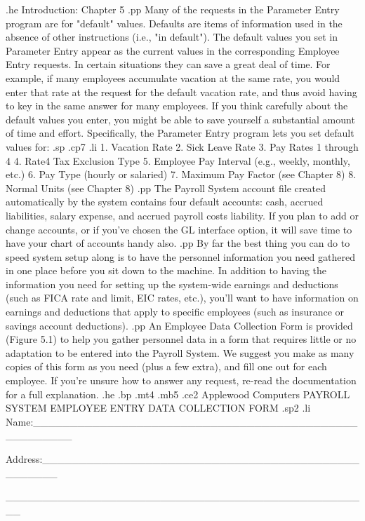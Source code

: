 .he Introduction: Chapter 5
.pp
Many of the requests in the Parameter Entry program are for "default"
values.  Defaults are items of information used in the absence of other
instructions (i.e., "in default").  The default values you set in
Parameter Entry appear as the current values in the corresponding
Employee Entry requests. In certain situations they can save a great
deal of time.  For example, if many employees accumulate vacation at
the same rate, you would enter that rate at the request for the default
vacation rate, and thus avoid having to key in the same answer for
many employees.  If you think carefully about the default values you
enter, you might be able to save yourself a substantial amount
of time and effort.  Specifically,
the Parameter Entry program lets you set default values for:
.sp
.cp7
.li
	1. Vacation Rate
	2. Sick Leave Rate
	3. Pay Rates 1 through 4
	4. Rate4 Tax Exclusion Type
	5. Employee Pay Interval (e.g., weekly, monthly, etc.)
	6. Pay Type (hourly or salaried)
	7. Maximum Pay Factor (see Chapter 8)
	8. Normal Units (see Chapter 8)
.pp
The Payroll System account file created automatically by the system contains
four default accounts: cash, accrued liabilities, salary expense, and accrued
payroll costs liability.  If you plan to add or change accounts, or if you've
chosen the GL interface option, it will save time to have your chart
of accounts handy also.
.pp
By far the best thing you can do to speed system setup along is to have the
personnel information you need gathered in one place before you sit
down to the machine.  In addition to having the information you need for
setting up the system-wide earnings and deductions (such as FICA rate
and limit, EIC rates, etc.), you'll want to have information on earnings
and deductions that apply to specific employees (such as insurance or
savings account deductions).
.pp
An Employee Data Collection Form is provided (Figure 5.1) to help you
gather personnel data in a form that requires little or no adaptation
to be entered into the Payroll System.	We suggest you make as many
copies of this form as you need (plus a few extra), and fill one out
for each employee.  If you're unsure how to answer any request, re-read
the documentation for a full explanation.
.he
.bp
.mt4
.mb5
.ce2
Applewood Computers PAYROLL SYSTEM
EMPLOYEE ENTRY DATA COLLECTION FORM
.sp2
.li
Name:_____________________________________________________

Address:__________________________________________________

	__________________________________________________

